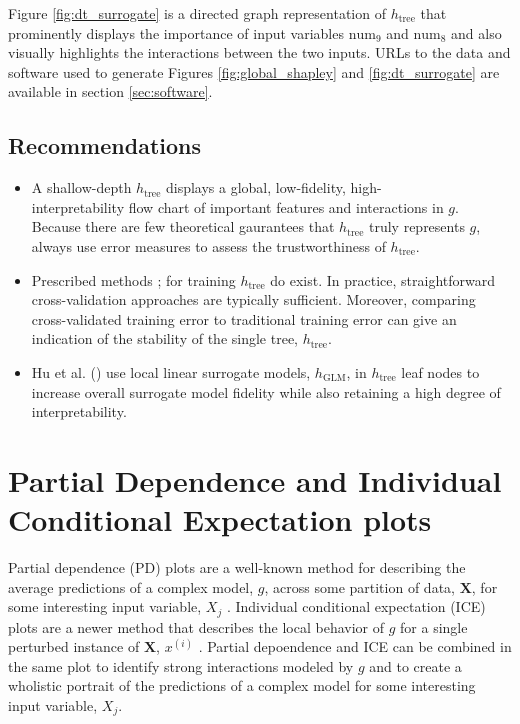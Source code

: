 \documentclass{article}
\begin{document}
Figure \ref{fig:dt_surrogate} is a directed graph representation of $h_{\text{tree}}$ that prominently displays the importance of input variables $\text{num}_9$ and $\text{num}_8$ and also visually highlights the interactions between the two inputs. URLs to the data and software used to generate Figures \ref{fig:global_shapley} and \ref{fig:dt_surrogate} are available in section \ref{sec:software}.

\subsection{Recommendations}

\begin{itemize}
	
	\item A shallow-depth $h_{\text{tree}}$ displays a global, low-fidelity, high-\\interpretability flow chart of important features and interactions in $g$. Because there are few theoretical gaurantees that $h_{\text{tree}}$ truly represents $g$, always use error measures to assess the trustworthiness of $h_{\text{tree}}$.
	
	\item Prescribed methods \cite{dt_surrogate1}; \cite{dt_surrogate2} for training $h_{\text{tree}}$ do exist. In practice, straightforward cross-validation approaches are typically sufficient. Moreover, comparing cross-validated training error to traditional training error can give an indication of the stability of the single tree, $h_{\text{tree}}$.
	
	\item Hu et al. (\citeyear{lime-sup}) use local linear surrogate models, $h_{\text{GLM}}$, in $h_{\text{tree}}$ leaf nodes to increase overall surrogate model fidelity while also retaining a high degree of interpretability.
	
\end{itemize}

\section{Partial Dependence and Individual Conditional Expectation plots}
\label{sec:pd_ice}

Partial dependence (PD) plots are a well-known method for describing the average predictions of a complex model, $g$, across some partition of data, $\mathbf{X}$, for some interesting input variable, $X_j$ \cite{esl}. Individual conditional expectation (ICE) plots are a newer method that describes the local behavior of $g$ for a single perturbed instance of $\mathbf{X}$, $x^{(i)}$ \cite{ice_plots}. Partial depoendence and ICE can be combined in the same plot to identify strong interactions modeled by $g$ and to create a wholistic portrait of the predictions of a complex model for some interesting input variable, $X_j$.
\end{document}
